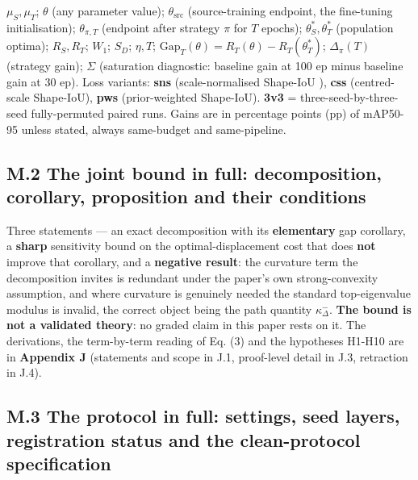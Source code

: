 \documentclass[pdflatex,sn-mathphys-ay]{sn-jnl}
\begin{document}
$\mu_S,\mu_T$; $\theta$ (any parameter value); $\theta_{\mathrm{src}}$ (source-training endpoint, the fine-tuning initialisation); $\theta_{\pi,T}$ (endpoint after strategy $\pi$ for $T$ epochs); $\theta^*_S,\theta^*_T$ (population optima); $R_S,R_T$; $W_1$; $S_D$; $\eta,T$; $\mathrm{Gap}_T(\theta)=R_T(\theta)-R_T(\theta^*_T)$; $\Delta_\pi(T)$ (strategy gain); $\Sigma$ (saturation diagnostic: baseline gain at 100 ep minus baseline gain at 30 ep). Loss variants: \textbf{sns} (scale-normalised Shape-IoU \citep{ding2023}), \textbf{css} (centred-scale Shape-IoU), \textbf{pws} (prior-weighted Shape-IoU). \textbf{3v3} = three-seed-by-three-seed fully-permuted paired runs. Gains are in percentage points (pp) of mAP50-95 unless stated, always same-budget and same-pipeline.

\subsection*{M.2 The joint bound in full: decomposition, corollary, proposition and their conditions}

Three statements --- an exact decomposition with its \textbf{elementary} gap corollary, a \textbf{sharp} sensitivity bound on the optimal-displacement cost that does \textbf{not} improve that corollary, and a \textbf{negative result}: the curvature term the decomposition invites is redundant under the paper's own strong-convexity assumption, and where curvature is genuinely needed the standard top-eigenvalue modulus is invalid, the correct object being the path quantity $\kappa^-_\Delta$. \textbf{The bound is not a validated theory}: no graded claim in this paper rests on it. The derivations, the term-by-term reading of Eq. (3) and the hypotheses H1-H10 are in \textbf{Appendix J} (statements and scope in J.1, proof-level detail in J.3, retraction in J.4).

\subsection*{M.3 The protocol in full: settings, seed layers, registration status and the clean-protocol specification}
\end{document}
